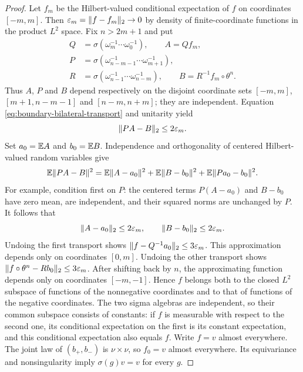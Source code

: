 \begin{proof}
Let $f_m$ be the Hilbert-valued conditional expectation of $f$ on
coordinates $[-m,m]$.  Then $\varepsilon_m=\lVert f-f_m\rVert_2\to0$ by density
of finite-coordinate functions in the product $L^2$ space.  Fix
$n>2m+1$ and put
\begin{align*}
 Q&=\sigma(\omega_m^{-1}\cdots\omega_0^{-1}),\qquad
 A=Qf_m,\\
 P&=\sigma(\omega_{n-m-1}^{-1}\cdots\omega_{m+1}^{-1}),\\
 R&=\sigma(\omega_{n-1}^{-1}\cdots\omega_{n-m}^{-1}),\qquad
 B=R^{-1}f_m\circ\theta^n.
\end{align*}
Thus $A$, $P$ and $B$ depend respectively on the disjoint coordinate
sets $[-m,m]$, $[m+1,n-m-1]$ and $[n-m,n+m]$; they are independent.
Equation \eqref{eq:boundary-bilateral-transport} and unitarity yield
\begin{equation}\label{eq:boundary-independent-blocks}
 \lVert PA-B\rVert_2\le2\varepsilon_m.
\end{equation}
Set $a_0=\mathbb E A$ and $b_0=\mathbb E B$.  Independence and orthogonality of
centered Hilbert-valued random variables give
\[
 \mathbb E\lVert PA-B\rVert^2
 =\mathbb E\lVert A-a_0\rVert^2+\mathbb E\lVert B-b_0\rVert^2
   +\mathbb E\lVert Pa_0-b_0\rVert^2.
\]
For example, condition first on $P$: the centered terms $P(A-a_0)$
and $B-b_0$ have zero mean, are independent, and their squared norms
are unchanged by $P$.  It follows that
\[
 \lVert A-a_0\rVert_2\le2\varepsilon_m,\qquad
 \lVert B-b_0\rVert_2\le2\varepsilon_m.
\]
Undoing the first transport shows
$\lVert f-Q^{-1}a_0\rVert_2\le3\varepsilon_m$.
This approximation depends only on coordinates $[0,m]$.
Undoing the other transport shows
$\lVert f\circ\theta^n-Rb_0\rVert_2\le3\varepsilon_m$.
After shifting back by $n$, the approximating function depends only on
coordinates $[-m,-1]$.  Hence $f$ belongs both to the closed $L^2$
subspace of functions of the nonnegative coordinates and to that of
functions of the negative coordinates.  The two sigma algebras are
independent, so their common subspace consists of constants: if $f$ is
measurable with respect to the second one, its conditional expectation
on the first is its constant expectation, and this conditional
expectation also equals $f$.  Write $f=v$ almost everywhere.
The joint law of $(b_+,b_-)$ is $\nu\times\nu$, so $f_0=v$ almost
everywhere.  Its equivariance and nonsingularity imply
$\sigma(g)v=v$ for every $g$.
\end{proof}
